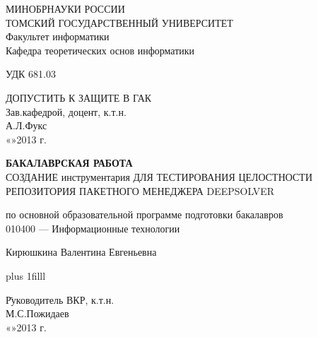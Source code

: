\normalsize
\thispagestyle{empty}
\begin{center}
МИНОБРНАУКИ РОССИИ\\
ТОМСКИЙ ГОСУДАРСТВЕННЫЙ УНИВЕРСИТЕТ\\
Факультет информатики\\
Кафедра теоретических основ информатики\\
\end{center}

\vspace{0.7cm}

УДК 681.03

\vspace{0.5cm}

\begin{flushright}
ДОПУСТИТЬ К ЗАЩИТЕ В ГАК\\
Зав.кафедрой, доцент, к.т.н.\\
\makebox[3cm]{\hrulefill}А.Л.Фукс\\
«\makebox[0.8cm]{\hrulefill}»\makebox[1.5cm]{\hrulefill}2013 г.\\
\end{flushright}



\begin{center}

\vspace{1.5cm}
{\bf БАКАЛАВРСКАЯ РАБОТА}\\
\vspace{0.5cm}
СОЗДАНИЕ инструментария ДЛЯ ТЕСТИРОВАНИЯ ЦЕЛОСТНОСТИ РЕПОЗИТОРИЯ ПАКЕТНОГО МЕНЕДЖЕРА DEEPSOLVER

\vspace{0.5cm}
по основной образовательной программе подготовки бакалавров\\
010400 --- Информационные технологии

\vspace{0.5cm}

Кирюшкина Валентина Евгеньевна


\end{center}

\vskip 0pt plus 1filll

\begin{tabbing}
\hspace{10cm}\=Руководитель ВКР, к.т.н.\\
\>\makebox[3cm]{\hrulefill}М.С.Пожидаев\\
\>«\makebox[0.8cm]{\hrulefill}»\makebox[1.5cm]{\hrulefill}2013 г.\\
\end{tabbing}

